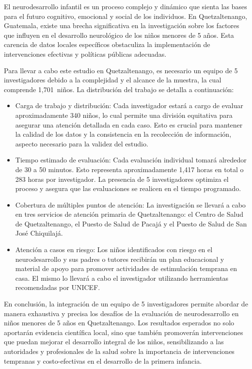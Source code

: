 \documentclass[11pt,letterpaper]{report}
\newcommand{\muestradeseada}{1,701}
\begin{document}
El neurodesarrollo infantil es un proceso complejo y dinámico que sienta las
bases para el futuro cognitivo, emocional y social de los individuos. En
Quetzaltenango, Guatemala, existe una brecha significativa en la investigación
sobre los factores que influyen en el desarrollo neurológico de los niños
menores de 5 años. Esta carencia de datos locales específicos obstaculiza la
implementación de intervenciones efectivas y políticas públicas adecuadas.

Para llevar a cabo este estudio en Quetzaltenango, es necesario un equipo de 5
investigadores debido a la complejidad y el alcance de la muestra, la cual
comprende \muestradeseada\ niños. La distribución del trabajo se detalla a
continuación:

	\begin{itemize}
		\item Carga de trabajo y distribución: Cada investigador estará a cargo
		de evaluar aproximadamente 340 niños, lo cual permite una división
		equitativa para asegurar una atención detallada en cada caso. Esto es
		crucial para mantener la calidad de los datos y la consistencia en la
		recolección de información, aspecto necesario para la validez del
		estudio.
		\item Tiempo estimado de evaluación: Cada evaluación individual tomará
		alrededor de 30 a 50 minutos. Esto representa aproximadamente 1,417
		horas en total o 283 horas por investigador. La presencia de 5
		investigadores optimiza el proceso y asegura que las evaluaciones se
		realicen en el tiempo programado.
		\item Cobertura de múltiples puntos de atención: La investigación se
		llevará a cabo en tres servicios de atención primaria de
		Quetzaltenango: el Centro de Salud de Quetzaltenango, el Puesto de
		Salud de Pacajá y el Puesto de Salud de San José Chiquilajá.
		\item Atención a casos en riesgo: Los niños identificados con riesgo en
		el neurodesarrollo y sus padres o tutores recibirán un plan educacional
		y material de apoyo para promover actividades de estimulación temprana
		en casa. El mismo lo llevará a cabo el investigador utilizando
		herramientas recomendadas por UNICEF.
	\end{itemize}

En conclusión, la integración de un equipo de 5 investigadores permite abordar
de manera exhaustiva y precisa los desafíos de la evaluación de neurodesarrollo
en niños menores de 5 años en Quetzaltenango. Los resultados esperados no solo
aportarán evidencia científica local, sino que también promoverán
intervenciones que puedan mejorar el desarrollo integral de los niños,
sensibilizando a las autoridades y profesionales de la salud sobre la
importancia de intervenciones tempranas y costo-efectivas en el desarrollo de
la primera infancia.
\end{document}
